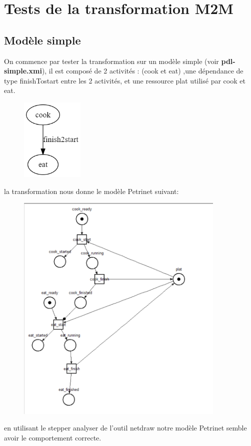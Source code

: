 \documentclass{article}
\begin{document}
\section{Tests de la transformation M2M}
\subsection{Modèle simple}
On commence par tester la transformation sur un modèle simple (voir \textbf{pdl-simple.xmi}), il est composé de 2 activités : (cook et eat)
,une dépendance de type finishTostart entre les 2 activités, et une ressource plat utilisé par cook et eat.
\begin{figure}[H]
    \centering
    \includegraphics[width = 3cm]{pdl-simple.png}
\end{figure}
la transformation nous donne le modèle Petrinet suivant:
\begin{figure}[H]
    \centering
    \includegraphics[width = 10cm]{net-simple.png}
\end{figure}
en utilisant le stepper analyser de l'outil netdraw notre modèle Petrinet semble avoir le comportement correcte.
\end{document}
